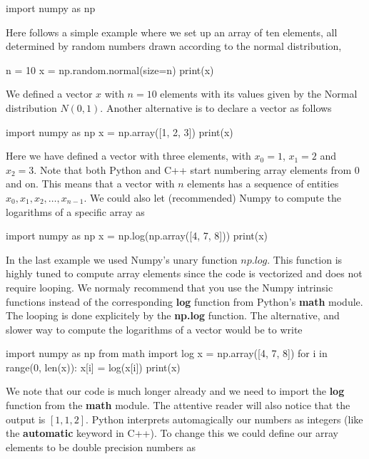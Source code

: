 \documentclass[%
oneside,                 %
final,                   %
10pt]{article}
\begin{document}
\bpycod
import numpy as np

\epycod

Here follows a simple example where we set up an array of ten elements, all determined by random numbers drawn according to the normal distribution,




\bpycod
n = 10
x = np.random.normal(size=n)
print(x)

\epycod

We defined a vector $x$ with $n=10$ elements with its values given by the Normal distribution $N(0,1)$.
Another alternative is to declare a vector as follows




\bpycod
import numpy as np
x = np.array([1, 2, 3])
print(x)

\epycod

Here we have defined a vector with three elements, with $x_0=1$, $x_1=2$ and $x_2=3$. Note that both Python and C++
start numbering array elements from $0$ and on. This means that a vector with $n$ elements has a sequence of entities $x_0, x_1, x_2, \dots, x_{n-1}$. We could also let (recommended) Numpy to compute the logarithms of a specific array as




\bpycod
import numpy as np
x = np.log(np.array([4, 7, 8]))
print(x)

\epycod


In the last example we used Numpy's unary function $np.log$. This function is
highly tuned to compute array elements since the code is vectorized
and does not require looping. We normaly recommend that you use the
Numpy intrinsic functions instead of the corresponding \textbf{log} function
from Python's \textbf{math} module. The looping is done explicitely by the
\textbf{np.log} function. The alternative, and slower way to compute the
logarithms of a vector would be to write








\bpycod
import numpy as np
from math import log
x = np.array([4, 7, 8])
for i in range(0, len(x)):
    x[i] = log(x[i])
print(x)

\epycod

We note that our code is much longer already and we need to import the \textbf{log} function from the \textbf{math} module. 
The attentive reader will also notice that the output is $[1, 1, 2]$. Python interprets automagically our numbers as integers (like the \textbf{automatic} keyword in C++). To change this we could define our array elements to be double precision numbers as
\end{document}

